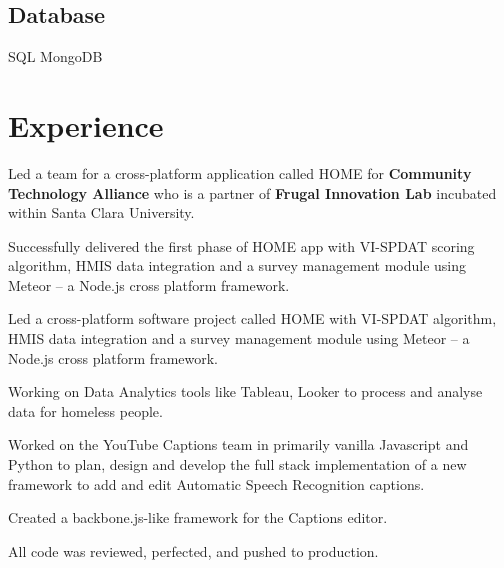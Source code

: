 \documentclass[]{deedy-resume-openfont}
\begin{document}
\begin{minipage}[t]{0.33\textwidth}
\subsection{Database}
SQL \textbullet{} MongoDB
\sectionsep

%
%

\end{minipage} 
\hfill
\begin{minipage}[t]{0.66\textwidth} 


\section{Experience}

\vspace{\topsep} %
\begin{tightemize}
\item Led a team for a cross-platform application called HOME for \textbf{Community Technology Alliance} who is a partner of \textbf{Frugal Innovation Lab} incubated within Santa Clara University.
\item Successfully delivered the first phase of HOME app with VI-SPDAT scoring algorithm, HMIS data integration and a survey management module using Meteor – a Node.js cross platform framework.
\end{tightemize}
\sectionsep

\begin{tightemize}
\item Led a cross-platform software project called HOME with VI-SPDAT algorithm, HMIS data integration and a survey management module using Meteor – a Node.js cross platform framework.
\item Working on Data Analytics tools like Tableau, Looker to process and analyse data for homeless people.
\end{tightemize}
\sectionsep

\begin{tightemize}
\item Worked on the YouTube Captions team in primarily vanilla Javascript and Python to plan, design and develop the full stack implementation of a new framework to add and edit Automatic Speech Recognition captions.
\item Created a backbone.js-like framework for the Captions editor.
\item All code was reviewed, perfected, and pushed to production.
\end{tightemize}
\sectionsep


\end{minipage}
\end{document}
